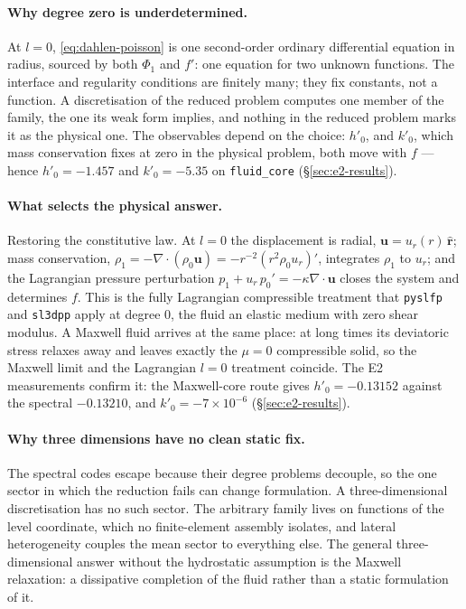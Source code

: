 \documentclass[11pt]{article}
\numberwithin{equation}{section}
\newcommand{\vu}{\mathbf{u}}
\newcommand{\rhat}{\hat{\mathbf{r}}}
\newcommand{\code}[1]{\texttt{#1}}
\begin{document}
\paragraph{Why degree zero is underdetermined.} At $l=0$,
\eqref{eq:dahlen-poisson} is one second-order ordinary differential
equation in radius, sourced by both $\Phi_1$ and $f'$: one equation for two
unknown functions. The interface and regularity conditions are finitely
many; they fix constants, not a function. A discretisation of the reduced
problem computes one member of the family, the one its weak form implies,
and nothing in the reduced problem marks it as the physical one. The
observables depend on the choice: $h'_0$, and $k'_0$, which mass
conservation fixes at zero in the physical problem, both move with $f$ ---
hence $h'_0=-1.457$ and $k'_0=-5.35$ on \code{fluid\_core}
(\S\ref{sec:e2-results}).

\paragraph{What selects the physical answer.} Restoring the constitutive
law. At $l=0$ the displacement is radial, $\vu=u_r(r)\,\rhat$; mass
conservation, $\rho_1 = -\nabla\cdot(\rho_0\vu) = -r^{-2}(r^2\rho_0u_r)'$,
integrates $\rho_1$ to $u_r$; and the Lagrangian pressure perturbation
$p_1 + u_r\,p_0' = -\kappa\nabla\cdot\vu$ closes the system and determines
$f$. This is the fully Lagrangian compressible treatment that
\code{pyslfp} and \code{sl3dpp} apply at degree 0, the fluid an elastic
medium with zero shear modulus. A Maxwell fluid arrives at the same place:
at long times its deviatoric stress relaxes away and leaves exactly the
$\mu=0$ compressible solid, so the Maxwell limit and the Lagrangian $l=0$
treatment coincide. The E2 measurements confirm it: the Maxwell-core route
gives $h'_0=-0.13152$ against the spectral $-0.13210$, and $k'_0=-7\times
10^{-6}$ (\S\ref{sec:e2-results}).

\paragraph{Why three dimensions have no clean static fix.} The spectral
codes escape because their degree problems decouple, so the one sector in
which the reduction fails can change formulation. A three-dimensional
discretisation has no such sector. The arbitrary family lives on functions
of the level coordinate, which no finite-element assembly isolates, and
lateral heterogeneity couples the mean sector to everything else. The
general three-dimensional answer without the hydrostatic assumption is
the Maxwell relaxation: a dissipative completion of the fluid rather
than a static formulation of it.
\end{document}
